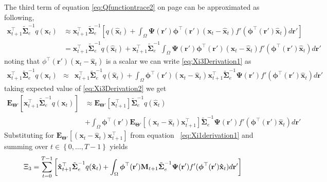 \documentclass[]{article}
\begin{document}
The third term of equation \ref{eq:Qfunctiontrace2} on page \pageref{eq:Qfunctiontrace2} can be approximated as following, 
\begin{align}\label{eq:Xi3Derivation1}
 \mathbf x_{t+1}^\top\tilde{\boldsymbol\Sigma}_e^{-1}q( \mathbf x_t) &\approx  \mathbf x_{t+1}^\top\tilde{\boldsymbol\Sigma}_e^{-1}\left[q(\mathbf {\hat x}_t)+\int_\Omega \boldsymbol{\Psi}(\mathbf{r}')\boldsymbol \phi^\top(\mathbf r') (\mathbf x_t - \mathbf  {\hat x}_t)f'(\boldsymbol \phi^\top(\mathbf r')\mathbf {\hat x}_t) d\mathbf{r}'\right] \nonumber \\
&=\mathbf x_{t+1}^\top\tilde{\boldsymbol\Sigma}_e^{-1}q(\mathbf {\hat x}_t)+\mathbf x_{t+1}^\top\tilde{\boldsymbol\Sigma}_e^{-1}\int_\Omega \boldsymbol{\Psi}(\mathbf{r}')\boldsymbol \phi^\top(\mathbf r') (\mathbf x_t - \mathbf  {\hat x}_t)f'(\boldsymbol \phi^\top(\mathbf r')\mathbf {\hat x}_t) d\mathbf{r}'
\end{align}
noting that $\phi^\top(\mathbf r') (\mathbf x_t - \mathbf  {\hat x}_t)$ is a scalar we can write \ref{eq:Xi3Derivation1} as 
\begin{eqnarray}\label{eq:Xi3Derivation2}
 \mathbf x_{t+1}^\top\tilde{\boldsymbol\Sigma}_e^{-1}q( \mathbf x_t) &\approx& \mathbf x_{t+1}^\top\tilde{\boldsymbol\Sigma}_e^{-1}q(\mathbf {\hat x}_t)+\int_\Omega \boldsymbol \phi^\top(\mathbf r') (\mathbf x_t - \mathbf  {\hat x}_t)\mathbf x_{t+1}^\top\tilde{\boldsymbol\Sigma}_e^{-1}    \boldsymbol{\Psi}(\mathbf{r}')f'(\boldsymbol \phi^\top(\mathbf r')\mathbf {\hat x}_t) d\mathbf{r}'
\end{eqnarray}
taking expected value of \ref{eq:Xi3Derivation2} we get 
\begin{align}\label{eq:Xi3Derivation3}
 \mathbf E_{\boldsymbol\Theta'}\left[\mathbf x_{t+1}^\top\tilde{\boldsymbol\Sigma}_e^{-1}q( \mathbf x_t)\right] &\approx \mathbf E_{\boldsymbol\Theta'}\left[\mathbf x_{t+1}^\top\right]\tilde{\boldsymbol\Sigma}_e^{-1}q(\mathbf {\hat x}_t) \nonumber \\
&+\int_\Omega \boldsymbol \phi^\top(\mathbf r')  \mathbf E_{\boldsymbol\Theta'}\left[(\mathbf x_t - \mathbf  {\hat x}_t)\mathbf x_{t+1}^\top\right]\tilde{\boldsymbol\Sigma}_e^{-1}    \boldsymbol{\Psi}(\mathbf{r}')f'(\boldsymbol \phi^\top(\mathbf r')\mathbf {\hat x}_t) d\mathbf{r}' 
\end{align}
Substituting for  $\mathbf E_{\boldsymbol\Theta'}\left[(\mathbf x_t - \mathbf  {\hat x}_t)\mathbf x_{t+1}^\top\right]$ from equation ~\ref{eq:Xi1derivation1} and summing over $t \in \left\lbrace 0, \dots, T-1\right\rbrace $ yields
\begin{equation}
\Xi_3=\sum_{t=0}^{T-1}\left[ \mathbf{\hat x}_{t+1}^\top\tilde{\boldsymbol\Sigma}_e^{-1}q(\mathbf{\hat x}_t)+\int_\Omega\boldsymbol \phi^\top(\mathbf r') \mathbf M_{t+1} \tilde{\boldsymbol\Sigma}_e^{-1}  \boldsymbol{\Psi}(\mathbf{r}') f'(\boldsymbol \phi^\top(\mathbf r')\mathbf {\hat x}_t) d\mathbf{r}'\right] \\	
\end{equation}
\end{document}
